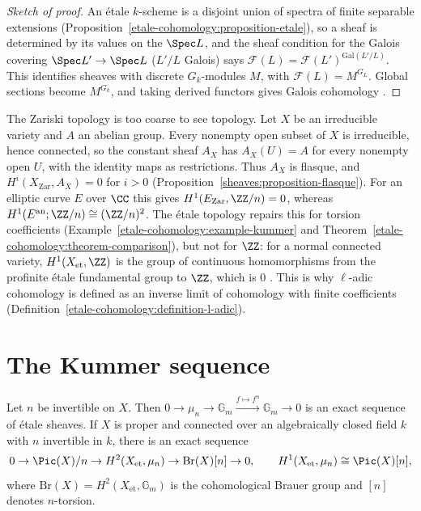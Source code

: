 \begin{proof}[Sketch of proof]
An \'etale $k$-scheme is a disjoint union of spectra of finite separable extensions (Proposition~\ref{etale-cohomology:proposition-etale}), so a sheaf is determined by its values on the
$\Spec L$, and the sheaf condition for the Galois covering $\Spec L' \to \Spec L$ ($L'/L$ Galois) says $\mathcal{F}(L) = \mathcal{F}(L')^{\mathrm{Gal}(L'/L)}$. This identifies sheaves with discrete
$G_k$-modules $M$, with $\mathcal{F}(L) = M^{G_L}$. Global sections become $M^{G_k}$, and taking derived functors gives Galois cohomology \cite[Chapters II and III]{milne-etale}.
\end{proof}

\begin{counterexample}\label{etale-cohomology:counterexample-zariski}
The Zariski topology is too coarse to see topology. Let $X$ be an irreducible variety and $A$ an abelian group. Every nonempty open subset of $X$ is irreducible, hence connected, so the constant sheaf $A_X$
has $A_X(U) = A$ for every nonempty open $U$, with the identity maps as restrictions. Thus $A_X$ is flasque, and $H^i(X_{\mathrm{Zar}}, A_X) = 0$ for $i > 0$
(Proposition~\ref{sheaves:proposition-flasque}). For an elliptic curve $E$ over $\CC$ this gives $H^1(E_{\mathrm{Zar}}, \ZZ/n) = 0$, whereas $H^1(E^{\mathrm{an}}; \ZZ/n) \cong (\ZZ/n)^2$. The \'etale topology
repairs this for torsion coefficients (Example~\ref{etale-cohomology:example-kummer} and Theorem~\ref{etale-cohomology:theorem-comparison}), but not for $\ZZ$: for a normal connected variety,
$H^1(X_{\mathrm{et}}, \ZZ)$ is the group of continuous homomorphisms from the profinite \'etale fundamental group to $\ZZ$, which is $0$ \cite[Chapter III]{milne-etale}. This is why $\ell$-adic cohomology is defined as
an inverse limit of cohomology with finite coefficients (Definition~\ref{etale-cohomology:definition-l-adic}).
\end{counterexample}

\section{The Kummer sequence}\label{etale-cohomology:section-kummer}

\begin{proposition}\label{etale-cohomology:proposition-kummer}
Let $n$ be invertible on $X$. Then $0 \to \mu_n \to \mathbb{G}_m \xrightarrow{f \mapsto f^n} \mathbb{G}_m \to 0$ is an exact sequence of \'etale sheaves. If $X$ is proper and connected over an
algebraically closed field $k$ with $n$ invertible in $k$, there is an exact sequence
\[
0 \to \Pic(X)/n \to H^2(X_{\mathrm{et}}, \mu_n) \to \mathrm{Br}(X)[n] \to 0, \qquad H^1(X_{\mathrm{et}}, \mu_n) \cong \Pic(X)[n],
\]
where $\mathrm{Br}(X) = H^2(X_{\mathrm{et}}, \mathbb{G}_m)$ is the cohomological Brauer group and $[n]$ denotes $n$-torsion.
\end{proposition}

